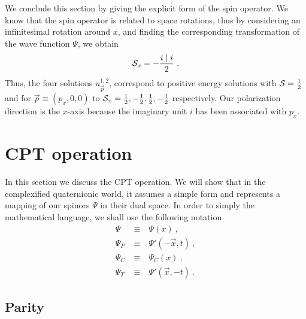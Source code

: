 We conclude this section by giving the explicit form of the spin operator. 
We know that the spin operator is related to space rotations, thus by 
considering an infinitesimal rotation around $x$, and finding the 
corresponding transformation of the wave function $\Psi$, we obtain
\begin{equation}
{\cal S}_x = - \frac{i \mid i}{2}~.
\end{equation}
Thus, the four solutions $u^{1,2}_{\vec{p}}$, correspond to positive 
energy solutions with ${\cal S}=\frac{1}{2}$ and for 
$\vec{p}\equiv (p_x,0,0)$ to 
${\cal S}_x = \frac{1}{2}, -\frac{1}{2}, \frac{1}{2}, -\frac{1}{2}$
respectively. Our polarization direction is the $x$-axis because the 
imaginary unit $i$ has been associated with $p_x$.






\section{CPT operation}
\label{s5}

In this section we discuss the CPT operation. We will show that in the 
complexified quaternionic world, it assumes a simple form and represents
a mapping of our spinors $\Psi$ in their dual space. In order to simply
the mathematical language, we shall use the following notation
\begin{eqnarray*}
\Psi   & ~\equiv~ & \Psi (x)~,\\
\Psi_P & ~\equiv~ & \Psi'(-\vec{x},t)~,\\
\Psi_C & ~\equiv~ & \Psi_C (x)~,\\
\Psi_T & ~\equiv~ & \Psi'(\vec{x},-t)~.
\end{eqnarray*}


\subsection{Parity}
\label{s51}


